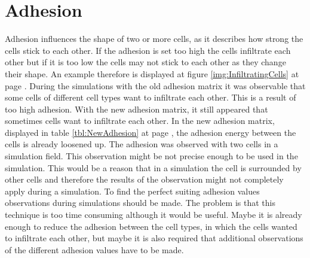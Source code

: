 \section{Adhesion}
Adhesion influences the shape of two or more cells, as it describes how strong the cells stick to each other. If the adhesion is set too high the cells infiltrate each other but if it is too low the cells may not stick to each other as they change their shape. An example therefore is displayed at figure \ref{img:InfiltratingCells} at page \pageref{img:InfiltratingCells}. During the simulations with the old adhesion matrix it was observable that some cells of different cell types want to infiltrate each other. This is a result of too high adhesion. With the new adhesion matrix, it still appeared that sometimes cells want to infiltrate each other. In the new adhesion matrix, displayed in table \ref{tbl:NewAdhesion} at page \pageref{tbl:NewAdhesion}, the adhesion energy between the cells is already loosened up. The adhesion was observed with two cells in a simulation field. This observation might be not precise enough to be used in the simulation. This would be a reason that in a simulation the cell is surrounded by other cells and therefore the results of the observation might not completely apply during a simulation. To find the perfect suiting adhesion values observations during simulations should be made. The problem is that this technique is too time consuming although it would be useful. Maybe it is already enough to reduce the adhesion between the cell types, in which the cells wanted to infiltrate each other, but maybe it is also required that additional observations of the different adhesion values have to be made.

